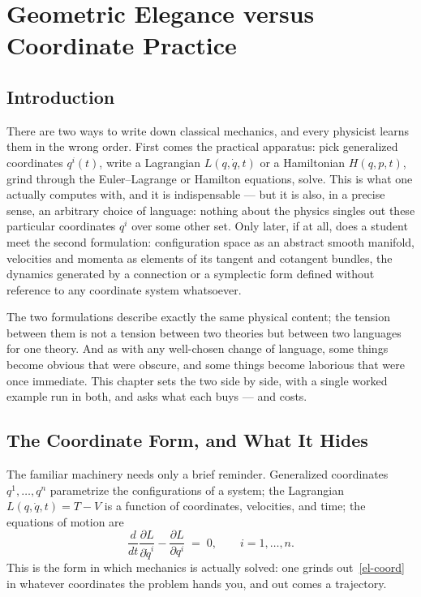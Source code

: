 \section{Geometric Elegance versus Coordinate Practice }
\label{cm:geom}

\subsection{Introduction}

There are two ways to write down classical mechanics, and every
physicist learns them in the wrong order. First comes the practical
apparatus: pick generalized coordinates $q^i(t)$, write a Lagrangian
$L(q,\dot q,t)$ or a Hamiltonian $H(q,p,t)$, grind through the
Euler--Lagrange or Hamilton equations, solve. This is what one
actually computes with, and it is indispensable --- but it is also,
in a precise sense, an arbitrary choice of language: nothing about
the physics singles out these particular coordinates $q^i$ over some
other set. Only later, if at all, does a student meet the second
formulation: configuration space as an abstract smooth manifold,
velocities and momenta as elements of its tangent and cotangent
bundles, the dynamics generated by a connection or a symplectic
form defined without reference to any coordinate system whatsoever.

The two formulations describe exactly the same physical content; the
tension between them is not a tension between two theories but
between two languages for one theory. And as with any well-chosen
change of language, some things become obvious that were obscure,
and some things become laborious that were once immediate. This
chapter sets the two side by side, with a single worked example run
in both, and asks what each buys --- and costs.

\subsection{The Coordinate Form, and What It Hides}

The familiar machinery needs only a brief reminder. Generalized
coordinates $q^1,\dots,q^n$ parametrize the configurations of a
system; the Lagrangian $L(q,\dot q,t) = T - V$ is a function of
coordinates, velocities, and time; the equations of motion are
\begin{equation}
  \frac{d}{dt}\frac{\partial L}{\partial \dot q^i}
  - \frac{\partial L}{\partial q^i} \;=\; 0,
  \qquad i=1,\dots,n.
  \label{el-coord}
\end{equation}
This is the form in which mechanics is actually solved: one grinds
out~\eqref{el-coord} in whatever coordinates the problem hands
you, and out comes a trajectory.

